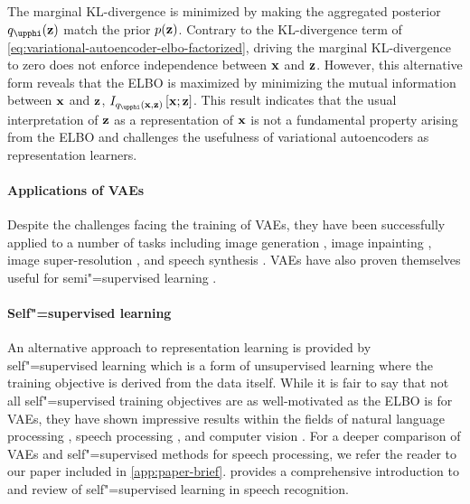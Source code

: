 The marginal KL-divergence is minimized by making the aggregated posterior $q_{\phib}(\zb)$ match the prior $p({\mathbf{z}})$. Contrary to the KL-divergence term of \cref{eq:variational-autoencoder-elbo-factorized}, driving the marginal KL-divergence to zero does not enforce independence between ${\mathbf{x}}$ and ${\mathbf{z}}$. 
However, this alternative form reveals that the ELBO is maximized by minimizing the mutual information between ${\mathbf{x}}$ and ${\mathbf{z}}$, $I_{q_{\phib}(\xb,\zb)}\left[\xb ; \zb \right]$. 
This result indicates that the usual interpretation of ${\mathbf{z}}$ as a representation of ${\mathbf{x}}$ is not a fundamental property arising from the ELBO and challenges the usefulness of variational autoencoders as representation learners.


\paragraph{Applications of VAEs}
Despite the challenges facing the training of VAEs, they have been successfully applied to a number of tasks including image generation \parencite{kingma_autoencoding_2014,rezende_stochastic_2014}, image inpainting \parencite{pathak_context_2016}, image super-resolution \parencite{sonderby_amortised_2017,chira_image_2022}, and speech synthesis \parencite{hsu_unsupervised_2017,hsu_hierarchical_2019}. 
VAEs have also proven themselves useful for semi"=supervised learning \parencite{kingma_semi-supervised_2014,kingma_improved_2016,maaloe_biva_2019}.


\paragraph{Self"=supervised learning}
An alternative approach to representation learning is provided by self"=supervised learning \parencite{mikolov_efficient_2013,devlin_bert_2018,chen_simple_2020,schneider_wav2vec_2019} which is a form of unsupervised learning where the training objective is derived from the data itself. 
While it is fair to say that not all self"=supervised training objectives are as well-motivated as the ELBO is for VAEs, they have shown impressive results within the fields of natural language processing \parencite{devlin_bert_2018,chen_simple_2020}, speech processing \parencite{schneider_wav2vec_2019}, and computer vision \parencite{chen_simple_2020}. 
For a deeper comparison of VAEs and self"=supervised methods for speech processing, we refer the reader to our paper \textcite{borgholt_brief_2022} included in \cref{app:paper-brief}. 
 provides a comprehensive introduction to and review of self"=supervised learning in speech recognition. 

